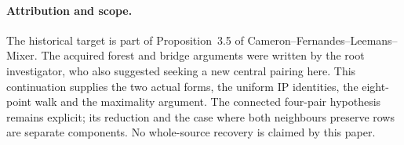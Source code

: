 \documentclass[11pt,a4paper]{article}
\begin{document}
\paragraph{Attribution and scope.}
The historical target is part of Proposition~3.5 of
Cameron--Fernandes--Leemans--Mixer. The acquired forest and bridge
arguments were written by the root investigator, who also suggested
seeking a new central pairing here. This continuation supplies the
two actual forms, the uniform IP identities, the eight-point walk
and the maximality argument. The connected four-pair hypothesis
remains explicit; its reduction and the case where both neighbours
preserve rows are separate components. No whole-source recovery is
claimed by this paper.
\end{document}
